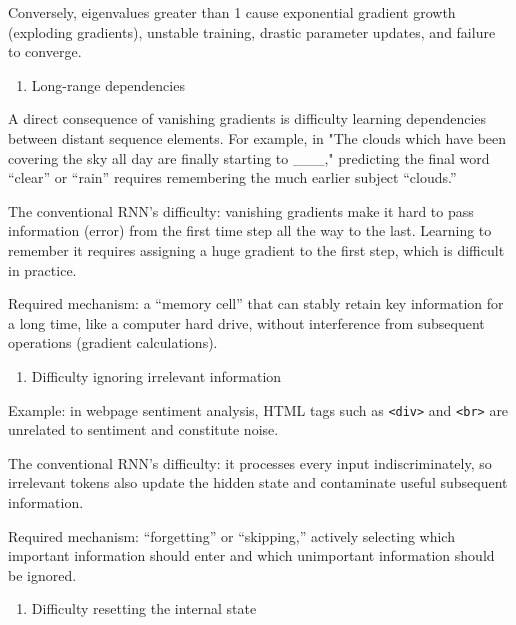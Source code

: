 Conversely, eigenvalues greater than 1 cause exponential gradient growth (exploding gradients), unstable training, drastic parameter updates, and failure to converge.

\begin{enumerate}
\def\labelenumi{\arabic{enumi}.}
\setcounter{enumi}{1}
\tightlist
\item
  Long-range dependencies
\end{enumerate}

A direct consequence of vanishing gradients is difficulty learning dependencies between distant sequence elements. For example, in "The clouds which have been covering the sky all day are finally starting to \_\_\_," predicting the final word ``clear'' or ``rain'' requires remembering the much earlier subject ``clouds.''

The conventional RNN's difficulty: vanishing gradients make it hard to pass information (error) from the first time step all the way to the last. Learning to remember it requires assigning a huge gradient to the first step, which is difficult in practice.

Required mechanism: a ``memory cell'' that can stably retain key information for a long time, like a computer hard drive, without interference from subsequent operations (gradient calculations).

\begin{enumerate}
\def\labelenumi{\arabic{enumi}.}
\setcounter{enumi}{2}
\tightlist
\item
  Difficulty ignoring irrelevant information
\end{enumerate}

Example: in webpage sentiment analysis, HTML tags such as \texttt{\textless{}div\textgreater{}} and \texttt{\textless{}br\textgreater{}} are unrelated to sentiment and constitute noise.

The conventional RNN's difficulty: it processes every input indiscriminately, so irrelevant tokens also update the hidden state and contaminate useful subsequent information.

Required mechanism: ``forgetting'' or ``skipping,'' actively selecting which important information should enter and which unimportant information should be ignored.

\begin{enumerate}
\def\labelenumi{\arabic{enumi}.}
\setcounter{enumi}{3}
\tightlist
\item
  Difficulty resetting the internal state
\end{enumerate}

